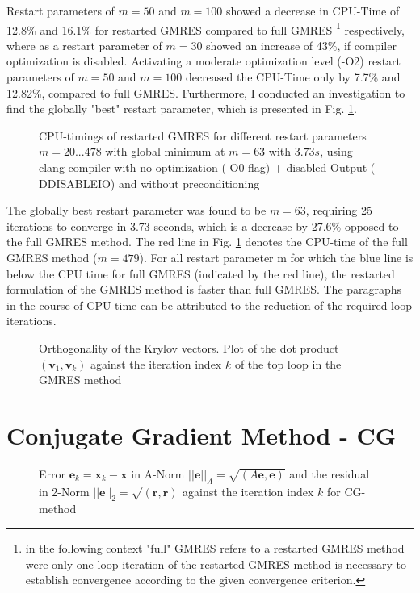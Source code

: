 \documentclass[11pt,a4paper]{article}
\newcommand{\refFig}[1]{Fig. \ref{#1}}
\begin{document}
\renewcommand{\arraystretch}{1}
%
Restart parameters of $m=50$ and $m=100$ showed a decrease in CPU-Time of 12.8\% and 16.1\% for restarted GMRES compared to full GMRES \footnote{in the following context "full" GMRES refers to a restarted GMRES method were only one loop iteration of the restarted GMRES method is necessary to establish convergence according to the given convergence criterion.} respectively, where as a restart parameter of $m=30$ showed an increase of 43\%, if compiler optimization is disabled. Activating a moderate optimization level (-O2) restart parameters of $m=50$ and $m=100$ decreased the CPU-Time only by 7.7\% and 12.82\%, compared to full GMRES. 
Furthermore, I conducted an investigation to find the globally "best" restart parameter, which is presented in \refFig{fig::Timings}. 
%
\begin{figure}[!htbp]
	\centering
	\hspace*{0.8cm}
	\leavevmode
	\resizebox{0.9\width}{!}{}
	\caption{CPU-timings of restarted GMRES for different restart parameters $m = {20...478} $ with global minimum at $m = 63$ with $3.73 s$, using clang compiler with no optimization (-O0 flag) + disabled Output (-DDISABLEIO) and without preconditioning}
	\label{fig::Timings}
\end{figure}
%
The globally best restart parameter was found to be $m=63$, requiring 25 iterations to converge in 3.73 seconds, which is a decrease by 27.6\% opposed to the full GMRES method. The red line in \refFig{fig::Timings} denotes the CPU-time of the full GMRES method ($m=479$). For all restart parameter m for which the blue line is below the CPU time for full GMRES (indicated by the red line), the restarted formulation of the GMRES method is faster than full GMRES. The paragraphs in the course of CPU time can be attributed to the reduction of the required loop iterations.
%
\begin{figure}[!htbp]
	\centering
	\hspace*{0.8cm}
	\leavevmode
	\resizebox{0.9\width}{!}{}
	\caption{Orthogonality of the Krylov vectors. Plot of the dot product $(\mathbf{v}_1, \mathbf{v}_k)$ against the iteration index $k$ of the top loop in the GMRES method}
	\label{fig::DotP}
\end{figure}



\section{Conjugate Gradient Method - CG}
\label{chapter:CG}

\begin{figure}[!htbp]
	\centering
	\hspace*{0.8cm}
	\leavevmode
	\resizebox{0.9\width}{!}{}
	\caption{Error $\mathbf{e}_k = \mathbf{x}_k - \mathbf{x} $ in A-Norm $||\mathbf{e}||_A = \sqrt{(A\mathbf{e}, \mathbf{e})}$ and the residual in 2-Norm $||\mathbf{e}||_2 = \sqrt{(\mathbf{r}, \mathbf{r})}$ against the iteration index $k$ for CG-method}
	\label{fig::CGNorms}
\end{figure}
\end{document}
